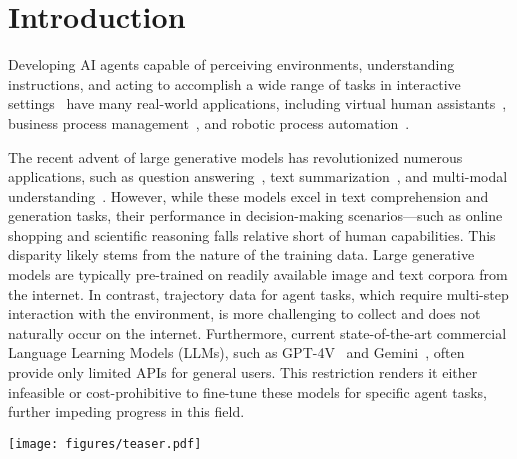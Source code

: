 \section{Introduction}

Developing AI agents capable of perceiving environments, understanding instructions, and acting to accomplish a wide range of tasks in interactive settings~\citep{1087032} have many real-world applications, including virtual human assistants~\citep{reed2022generalistagent,casheekar2024contemporary}, business process management~\citep{kirchdorfer2024agentsimulator}, and robotic process automation~\citep{rana2023sayplan,saycan2022arxiv,dipalo2023unifiedagentfoundationmodels}.

The recent advent of large generative models has revolutionized numerous applications, such as question answering~\citep{rajpurkar2016squad100000questionsmachine}, text summarization~\citep{NIPS2015_afdec700}, and multi-modal understanding~\citep{chen2015microsoftcococaptionsdata,balanced_vqa_v2,yu2016modelingcontextreferringexpressions}. However, while these models excel in text comprehension and generation tasks, their performance in decision-making scenarios—such as online shopping and scientific reasoning falls relative short of human capabilities.
This disparity likely stems from the nature of the training data. Large generative models are typically pre-trained on readily available image and text corpora from the internet. In contrast, trajectory data for agent tasks, which require multi-step interaction with the environment, is more challenging to collect and does not naturally occur on the internet.
Furthermore, current state-of-the-art commercial Language Learning Models (LLMs), such as GPT-4V~\citep{openai2024gpt4technicalreport} and Gemini~\citep{reid2024gemini}, often provide only limited APIs for general users. This restriction renders it either infeasible or cost-prohibitive to fine-tune these models for specific agent tasks, further impeding progress in this field.

\begin{figure*}[t]
  \centering
  \texttt{[image: figures/teaser.pdf]}
   \caption{
   In Fig.~\ref{fig:teaser}~(a), we show that it is difficult for LLM agents to generate multi-step plans in an interactive environment to achieve the instruction goal. However, it is relatively easy for an LLM to learn a reward model that can evaluate whether the trajectories meet the task instructions, as shown in Fig.~\ref{fig:teaser}~(b). In Fig.~\ref{fig:teaser}~(c), we show that a learned reward model can be used to guide the default policy models to improve action planning.}
   \label{fig:teaser}
\end{figure*}


